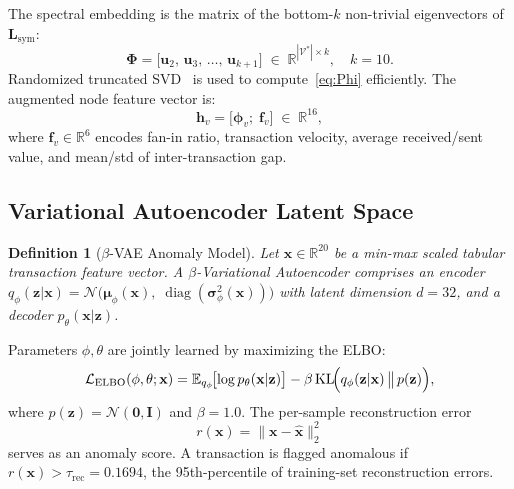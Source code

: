 \documentclass[journal]{IEEEtran}
\newtheorem{definition}{Definition}
\begin{document}
The spectral embedding is the matrix of the bottom-$k$ non-trivial
eigenvectors of $\mathbf{L}_{\mathrm{sym}}$:
\begin{equation}
  \boldsymbol{\Phi}
    = \bigl[\mathbf{u}_{2},\,\mathbf{u}_{3},\,\ldots,\,\mathbf{u}_{k+1}\bigr]
    \;\in\; \mathbb{R}^{|\mathcal{V}^{*}|\times k},
  \quad k = 10.
  \label{eq:Phi}
\end{equation}
Randomized truncated SVD~\cite{Halko2011} is used to compute~\eqref{eq:Phi}
efficiently. The augmented node feature vector is:
\begin{equation}
  \mathbf{h}_{v}
    = \bigl[\boldsymbol{\phi}_{v};\; \mathbf{f}_{v}\bigr]
    \;\in\; \mathbb{R}^{16},
  \label{eq:hv}
\end{equation}
where $\mathbf{f}_{v}\in\mathbb{R}^{6}$ encodes fan-in ratio, transaction
velocity, average received/sent value, and mean/std of inter-transaction gap.

\subsection{Variational Autoencoder Latent Space}
\label{subsec:vae_def}

\begin{definition}[$\beta$-VAE Anomaly Model]
Let $\mathbf{x}\in\mathbb{R}^{20}$ be a min-max scaled tabular transaction
feature vector.  A $\beta$-Variational Autoencoder comprises an encoder
$q_{\phi}(\mathbf{z}|\mathbf{x}) =
\mathcal{N}\!\bigl(\boldsymbol{\mu}_{\phi}(\mathbf{x}),\;
\operatorname{diag}(\boldsymbol{\sigma}^{2}_{\phi}(\mathbf{x}))\bigr)$
with latent dimension $d=32$, and a decoder $p_{\theta}(\mathbf{x}|\mathbf{z})$.
\end{definition}

Parameters $\phi,\theta$ are jointly learned by maximizing the ELBO:
\begin{equation}
  \mathcal{L}_{\mathrm{ELBO}}(\phi,\theta;\mathbf{x})
    = \mathbb{E}_{q_{\phi}}\!\bigl[\log p_{\theta}(\mathbf{x}|\mathbf{z})\bigr]
      - \beta\,\mathrm{KL}\!\Bigl(q_{\phi}(\mathbf{z}|\mathbf{x})
        \,\big\|\,p(\mathbf{z})\Bigr),
  \label{eq:elbo}
\end{equation}
where $p(\mathbf{z})=\mathcal{N}(\mathbf{0},\mathbf{I})$ and $\beta = 1.0$.
The per-sample reconstruction error
\begin{equation}
  r(\mathbf{x})
    = \bigl\|\mathbf{x} - \hat{\mathbf{x}}\bigr\|_{2}^{2}
  \label{eq:recon}
\end{equation}
serves as an anomaly score. A transaction is flagged anomalous if
$r(\mathbf{x}) > \tau_{\mathrm{rec}} = 0.1694$, the 95th-percentile of
training-set reconstruction errors.
\end{document}
